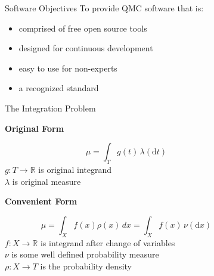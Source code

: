 \documentclass[final]{beamer}
\newcommand{\bfCenter}[1]{\centerline{\textbf{#1}}}
\newlength{\sepwid}
\newlength{\onecolwid}
\newlength{\threecolwid}
\newcommand{\dif}{\mathrm{d}}
\begin{document}
\setlength{\belowcaptionskip}{2ex}
\setlength\belowdisplayshortskip{2ex}
\begin{frame}[t]
\vspace{-2ex}
\begin{columns}[t]

\begin{column}{\sepwid}\end{column}
\begin{column}{\threecolwid}
\begin{columns}[t,totalwidth=\threecolwid]  

\begin{column}{\onecolwid}\vspace{-1in}
\begin{block}{Software Objectives}
    To provide QMC software \cite{HicEtal19} that is: 
    \begin{itemize}
        \item comprised of free open source tools
        \item designed for continuous development
        \item easy to use for non-experts
        \item a recognized standard
    \end{itemize}
\end{block}

\vspace{-2ex}
\begin{block}{The Integration Problem}
    \bfCenter{Original Form}
        \begin{equation*}
            \mu = \int_{T} g(t) \, \lambda(\dif t) 
            \label{eq:ogProblem}
        \end{equation*}
        $ g:T \rightarrow \mathbb{R}  $ is original integrand \\
        $ \lambda $ is original measure

    \vspace{2ex}
    \bfCenter{Convenient Form}
        \begin{equation*}
            \mu = \int_{X} f(x)\rho(x)\, dx = \int_{X} f(x) \, \nu( \dif x)
            \label{convForm}
        \end{equation*}
	$f: X \rightarrow \mathbb{R} $ is integrand after change of variables\\
        $\nu  $ is some well defined probability measure\\
        $\rho: X \rightarrow T $ is the probability density
       

\end{block}
\end{column}
\end{columns}
\end{column}
\end{columns}
\end{frame}
\end{document}
